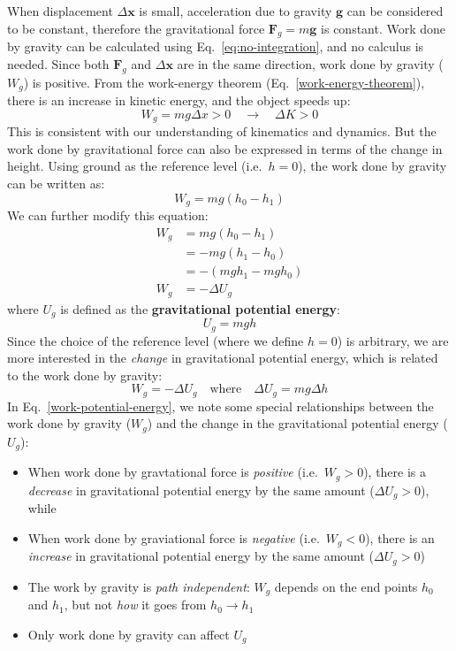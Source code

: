 When displacement $\Delta\bm x$ is small, acceleration due to gravity
$\bm g$ can be considered to be constant, therefore the gravitational
force $\bm F_g=m\bm g$ is constant. Work done by gravity can be
calculated using Eq.~\ref{eq:no-integration}, and no calculus is needed. Since
both $\bm F_g$ and $\Delta\bm x$ are in the same direction, work done
by gravity ($W_g$) is positive. From the work-energy theorem
(Eq.~\ref{work-energy-theorem}), there is an increase in kinetic energy, and
the object speeds up:
\begin{equation*}
  W_g=mg\Delta x>0 \quad\longrightarrow\quad \Delta K > 0
\end{equation*}
This is consistent with our understanding of kinematics and dynamics. But the
work done by gravitational force can also be expressed in terms of the change
in height. Using ground as the reference level (i.e.\ $h=0$), the work done by
gravity can be written as:
\begin{equation*}
  W_g = mg(h_0-h_1)
\end{equation*}
We can further modify this equation:
\begin{align}
  W_g &= mg(h_0-h_1)\nonumber\\
  & = -mg(h_1-h_0)\nonumber\\
  & = -(mgh_1-mgh_0)\nonumber\\
  W_g &= -\Delta U_g
\end{align}
where $U_g$ is defined as the \textbf{gravitational potential energy}:
\begin{equation}
  \boxed{U_g=mgh}
\end{equation}
Since the choice of the reference level (where we define $h=0$) is arbitrary,
we are more interested in the \emph{change} in gravitational potential energy,
which is related to the work done by gravity:
\begin{equation}
  \boxed{
    W_g=-\Delta U_g
  }\quad\text{where}\quad
  \boxed{
    \Delta U_g=mg\Delta h
  }
  \label{work-potential-energy}
\end{equation}
In Eq.~\ref{work-potential-energy}, we note some special relationships between
the work done by gravity ($W_g$) and the change in the gravitational potential
energy ($U_g$):
\begin{definition}
  \begin{itemize}[itemsep=3pt,leftmargin=15pt]
  \item When work done by gravtational force is \emph{positive} (i.e.\
    $W_g>0$), there is a \emph{decrease} in gravitational potential energy by
    the same amount ($\Delta U_g>0$), while
  \item When work done by graviational force is \emph{negative} (i.e.\
    $W_g<0$), there is an \emph{increase} in gravitational potential energy by
    the same amount ($\Delta U_g>0$)
  \item The work by gravity is \emph{path independent}: $W_g$ depends on the end
    points $h_0$ and $h_1$, but not \emph{how} it goes from
    $h_0\rightarrow h_1$
  \item Only work done by gravity can affect $U_g$
  \end{itemize}
\end{definition}
